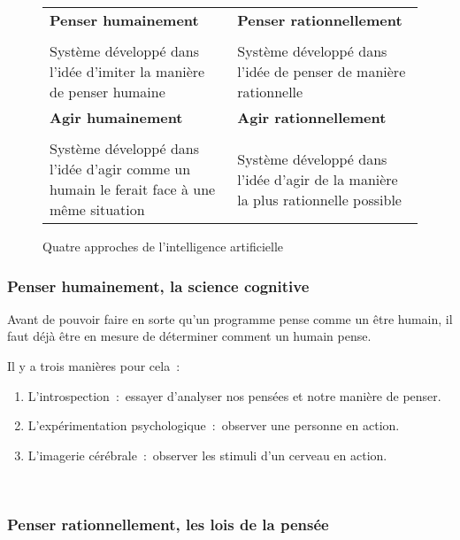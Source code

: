 \FloatBarrier
\begin{figure}[h!]
    \begin{center}
        \begin{tabular}{ |m{}|m{}| }
            \hline
            \textbf{Penser humainement} & \textbf{Penser rationnellement} \\
            &\\
            Système développé dans l'idée d'imiter la manière de penser humaine & Système développé dans l'idée de penser de manière rationnelle \\
            \hline
            \textbf{Agir humainement} & \textbf{Agir rationnellement} \\
            &\\
            Système développé dans l'idée d'agir comme un humain le ferait face à une même situation & Système développé dans l'idée d'agir de la manière la plus rationnelle possible \\
            \hline
        \end{tabular}
    \end{center}
    \caption{Quatre approches de l'intelligence artificielle}
    \label{figure:ai_approaches}
\end{figure}
\FloatBarrier

\subsubsection{Penser humainement, la science cognitive}

Avant de pouvoir faire en sorte qu'un programme pense comme un être humain, il faut déjà être en mesure de déterminer comment un humain pense.

Il y a trois manières pour cela~:~
\\
\begin{enumerate}
    \item L'introspection~:~essayer d'analyser nos pensées et notre manière de penser.
    \item L'expérimentation psychologique~:~observer une personne en action.
    \item L'imagerie cérébrale~:~observer les stimuli d'un cerveau en action.
\end{enumerate}
~\\

\subsubsection{Penser rationnellement, les lois de la pensée}

